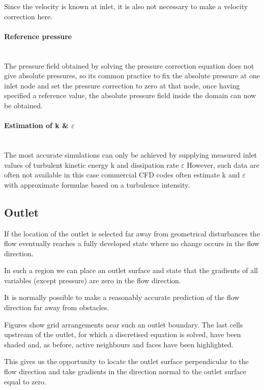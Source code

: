\documentclass[a4paper, 15pt]{article}
\begin{document}
Since
the velocity is known at inlet, it is also not necessary to make a velocity correction here. 

\paragraph{Reference pressure} \mbox{} \\
The
pressure field obtained by solving the pressure correction equation does not give absolute
pressures, so its common practice to fix the absolute pressure at one inlet node and set the pressure
correction to zero at that node, once having specified a reference value, the absolute pressure field inside the domain can now be
obtained. 

\paragraph{Estimation of k \& $\varepsilon$} \mbox{} \\
The
most accurate simulations can only be achieved by supplying measured inlet values of
turbulent kinetic energy k and dissipation rate $\varepsilon$
However,
such data are often not available in this case commercial CFD codes often estimate k
and $\varepsilon$ with approximate formulae based on a turbulence intensity.

\subsection*{Outlet}
If
the location of the outlet is selected far away from geometrical disturbances the flow
eventually reaches a fully developed state where no change occurs in the flow direction.

In
such a region we can place an outlet surface and state that the gradients of all variables
(except pressure) are zero in the flow direction.

It
is normally possible to make a reasonably accurate prediction of the flow direction far away
from obstacles. \newline 

Figures
show grid arrangements near such an outlet boundary.
The
last cells upstream of the outlet, for which a discretised equation is solved, have been
shaded and, as before, active neighbours and faces have been highlighted. \newline

This
gives us the opportunity to locate the outlet surface perpendicular to the flow direction and
take gradients in the direction normal to the outlet surface equal to zero. 
\end{document}

